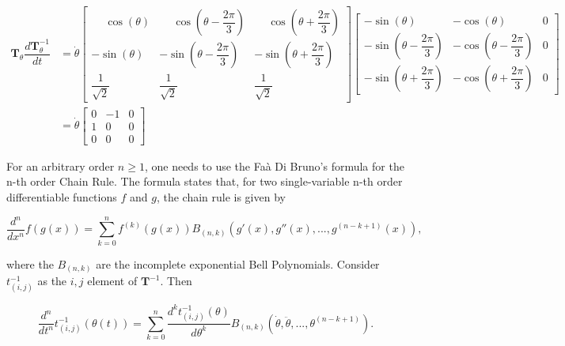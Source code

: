 \begin{align}
\mathbf{T}_\theta\dfrac{d\mathbf{T}^{-1}_\theta}{dt} &= \dot{\theta}
\left[\begin{array}{ccc}
\phantom{-}\cos\left(\theta\right) & \phantom{-}\cos\left(\theta - \dfrac{2\pi}{3}\right) & \phantom{-}\cos\left(\theta + \dfrac{2\pi}{3}\right) \\[5mm]
-\sin\left(\theta\right) & -\sin\left(\theta - \dfrac{2\pi}{3}\right) & -\sin\left(\theta + \dfrac{2\pi}{3}\right) \\[5mm]
\dfrac{1}{\sqrt{2}} & \dfrac{1}{\sqrt{2}} & \dfrac{1}{\sqrt{2}} 
\end{array}\right]
\left[\begin{array}{ccc}
-\sin\left(\theta\right)                   & -\cos\left(\theta\right)                   & 0 \\[5mm]
-\sin\left(\theta - \dfrac{2\pi}{3}\right) & -\cos\left(\theta - \dfrac{2\pi}{3}\right) & 0 \\[5mm] 
-\sin\left(\theta + \dfrac{2\pi}{3}\right) & -\cos\left(\theta + \dfrac{2\pi}{3}\right) & 0 
\end{array}\right] \nonumber\\[5mm]
%
&=\dot{\theta}\left[\begin{array}{ccc}
0 & -1 & 0 \\[5mm]
1 &  0 & 0 \\[5mm]
0 &  0 & 0
\end{array}\right]
\end{align}

	For an arbitrary order $n \geq 1$, one needs to use the Faà Di Bruno's formula  for the n-th order Chain Rule. The formula states that, for two single-variable n-th order differentiable functions $f$ and $g$, the chain rule is given by

\begin{equation} \dfrac{d^n}{dx^n} f\left(g\left(x\right)\right)= \sum\limits_{k=0}^n f^{\left(k\right)}\left(g\left(x\right)\right) B_{\left(n,k\right)}\left(g'\left(x\right),g''\left(x\right),...,g^{\left(n-k+1\right)}\left(x\right)\right), \end{equation}

	where the $B_{\left(n,k\right)}$ are the incomplete exponential Bell Polynomials. Consider $t^{-1}_{\left(i,j\right)}$ as the $i,j$ element of $\mathbf{T}^{-1}$. Then	

\begin{equation} \dfrac{d^n}{dt^n} t^{-1}_{\left(i,j\right)} \left(\theta\left(t\right)\right)= \sum\limits_{k=0}^n \dfrac{d^k t^{-1}_{\left(i,j\right)}\left(\theta\right)}{d\theta^k} B_{\left(n,k\right)}\left(\dot{\theta},\ddot{\theta},...,\theta^{(n-k+1)}\right). \end{equation}

